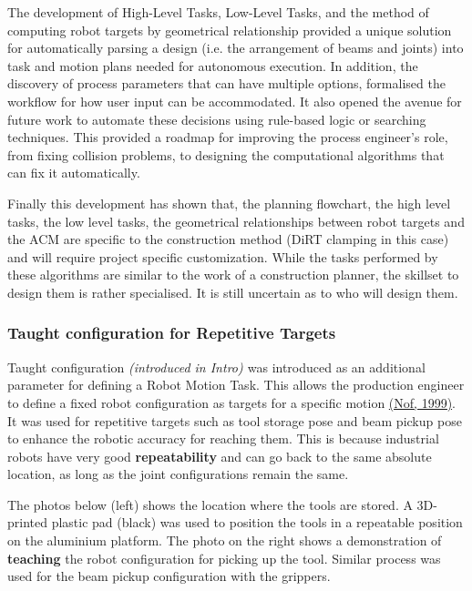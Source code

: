 \documentclass[11pt]{book}
\begin{document}
The development of High-Level Tasks, Low-Level Tasks, and the method of computing robot targets by geometrical relationship provided a unique solution for automatically parsing a design (i.e. the arrangement of beams and joints) into task and motion plans needed for autonomous execution. In addition, the discovery of process parameters that can have multiple options, formalised the workflow for how user input can be accommodated. It also opened the avenue for future work to automate these decisions using rule-based logic or searching techniques. This provided a roadmap for improving the process engineer’s role, from fixing collision problems, to designing the computational algorithms that can fix it automatically. 

Finally this development has shown that, the planning flowchart, the high level tasks, the low level tasks, the geometrical relationships between robot targets and the ACM are specific to the construction method (DiRT clamping in this case) and will require project specific customization. While the tasks performed by these algorithms are similar to the work of a construction planner, the skillset to design them is rather specialised. It is still uncertain as to who will design them.

\subsubsection{Taught configuration for Repetitive Targets}

Taught configuration \textit{\textcolor[HTML]{B7B7B7}{(introduced in Intro) }}was introduced as an additional parameter for defining a Robot Motion Task. This allows the production engineer to define a fixed robot configuration as targets for a specific motion \href{https://www.zotero.org/google-docs/?nTPVNG}{(Nof, 1999)}. It was used for repetitive targets such as tool storage pose and beam pickup pose to enhance the robotic accuracy for reaching them. This is because industrial robots have very good \textbf{repeatability }and can go back to the same absolute location, as long as the joint configurations remain the same. 

The photos below (left) shows the location where the tools are stored. A 3D-printed plastic pad (black) was used to position the tools in a repeatable position on the aluminium platform. The photo on the right shows a demonstration of \textbf{teaching }the robot configuration for picking up the tool. Similar process was used for the beam pickup configuration with the grippers.
\end{document}

